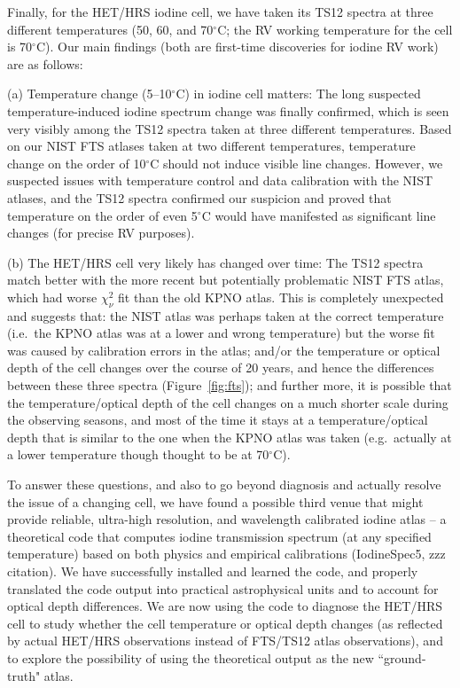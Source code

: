 \documentclass[12pt]{article}
\def\degree{^{\circ}}
\begin{document}
Finally, for the HET/HRS iodine cell, we have taken its TS12 spectra
at three different temperatures (50, 60, and 70$\degree$C; the RV
working temperature for the cell is 70$\degree$C). Our main findings
(both are first-time discoveries for iodine RV work) are as follows:

(a) Temperature change (5--10$\degree$C) in iodine cell matters: The
long suspected temperature-induced iodine spectrum change was finally
confirmed, which is seen very visibly among the TS12 spectra taken at
three different temperatures. Based on our NIST FTS atlases taken at
two different temperatures, temperature change on the order of
10$\degree$C should not induce visible line changes. However, we
suspected issues with temperature control and data calibration with
the NIST atlases, and the TS12 spectra confirmed our suspicion and
proved that temperature on the order of even 5$\degree$C would have
manifested as significant line changes (for precise RV purposes).

(b) The HET/HRS cell very likely has changed over time: The TS12
spectra match better with the more recent but potentially problematic
NIST FTS atlas, which had worse $\chi^2_\nu$ fit than the old KPNO
atlas. This is completely unexpected and suggests that: the NIST atlas
was perhaps taken at the correct temperature (i.e.\ the KPNO atlas was
at a lower and wrong temperature) but the worse fit was caused by
calibration errors in the atlas; and/or the temperature or optical
depth of the cell changes over the course of 20 years, and hence the
differences between these three spectra (Figure~\ref{fig:fts}); and
further more, it is possible that the temperature/optical depth of the
cell changes on a much shorter scale during the observing seasons, and
most of the time it stays at a temperature/optical depth that is
similar to the one when the KPNO atlas was taken (e.g.\ actually at a
lower temperature though thought to be at 70$\degree$C).

To answer these questions, and also to go beyond diagnosis and
actually resolve the issue of a changing cell, we have found a
possible third venue that might provide reliable, ultra-high
resolution, and wavelength calibrated iodine atlas -- a theoretical
code that computes iodine transmission spectrum (at any specified
temperature) based on both physics and empirical calibrations
(IodineSpec5, zzz citation). We have successfully installed and
learned the code, and properly translated the code output into
practical astrophysical units and to account for optical depth
differences. We are now using the code to diagnose the HET/HRS cell to
study whether the cell temperature or optical depth changes (as
reflected by actual HET/HRS observations instead of FTS/TS12 atlas
observations), and to explore the possibility of using the theoretical
output as the new ``ground-truth" atlas.
\end{document}
